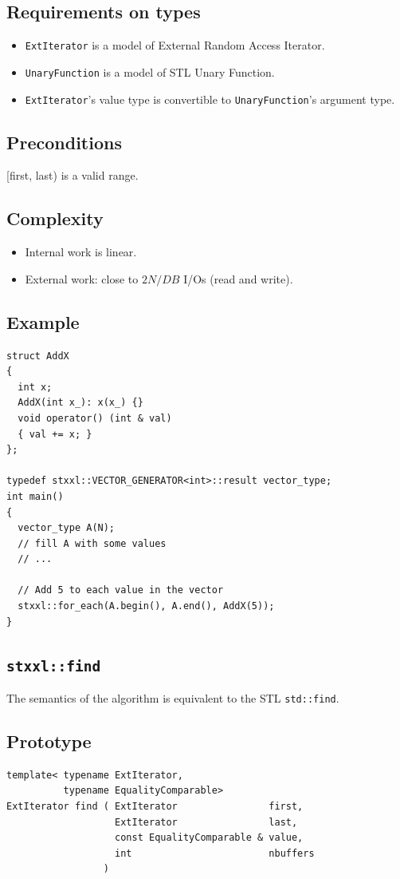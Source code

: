 \documentclass[twoside]{book}
\begin{document}
\subsection*{Requirements on types}
\begin{itemize}
\item \texttt{ExtIterator} is a model of External Random Access
Iterator.
\item \texttt{UnaryFunction} is a model of STL Unary Function.
\item \texttt{ExtIterator}'s value type is convertible to
\texttt{UnaryFunction}'s argument type.
\end{itemize}
\subsection*{Preconditions}
[first, last) is a valid range.
\subsection*{Complexity}
\begin{itemize}
\item Internal work is linear.
\item External work: close to $2N/DB$ I/Os (read and write).
\end{itemize}

\subsection*{Example}
\begin{lstlisting}
struct AddX
{
  int x;
  AddX(int x_): x(x_) {}
  void operator() (int & val)
  { val += x; }
};

typedef stxxl::VECTOR_GENERATOR<int>::result vector_type;
int main()
{
  vector_type A(N);
  // fill A with some values
  // ...  

  // Add 5 to each value in the vector
  stxxl::for_each(A.begin(), A.end(), AddX(5));
}
\end{lstlisting}
\subsection{\texttt{stxxl::find}}
\label{stxxl::find}
The semantics of the algorithm is equivalent to the STL
\texttt{std::find}.

\subsection*{Prototype}
\begin{lstlisting}
template< typename ExtIterator, 
          typename EqualityComparable>
ExtIterator find ( ExtIterator                first,
                   ExtIterator                last,
                   const EqualityComparable & value,
                   int                        nbuffers
                 )  
\end{lstlisting}
\end{document}
